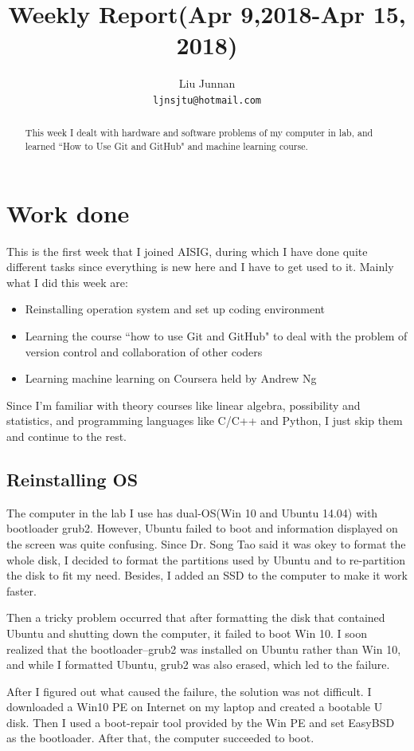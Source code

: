\documentclass{article} %
\title{Weekly Report(Apr 9,2018-Apr 15, 2018)}
\author{
Liu Junnan\\
\texttt{ljnsjtu@hotmail.com}
}
\begin{document}
\maketitle

\begin{abstract}
    This week I dealt with hardware and software problems of my computer in lab, and learned ``How to Use Git and GitHub" and machine learning course.
\end{abstract}

\section{Work done}
This is the first week that I joined AISIG, during which I have done quite different tasks since everything is new here and I have to get used to it. Mainly what I did this week are:
\begin{itemize}
    \item Reinstalling operation system and set up coding environment
    \item Learning the course ``how to use Git and GitHub" to deal with the problem of version control and collaboration of other coders
    \item Learning machine learning on Coursera held by Andrew Ng
\end{itemize}
Since I'm familiar with theory courses like linear algebra, possibility and statistics, and programming languages like C/C++ and Python, I just skip them and continue to the rest.

\subsection{Reinstalling OS}
The computer in the lab I use has dual-OS(Win 10 and Ubuntu 14.04) with bootloader grub2. However, Ubuntu failed to boot and information displayed on the screen was quite confusing. Since Dr. Song Tao said it was okey to format the whole disk, I decided to format the partitions used by Ubuntu and to re-partition the disk to fit my need. Besides, I added an SSD to the computer to make it work faster.

Then a tricky problem occurred that after formatting the disk that contained Ubuntu and shutting down the computer, it failed to boot Win 10. I soon realized that the bootloader--grub2 was installed on Ubuntu rather than Win 10, and while I formatted Ubuntu, grub2 was also erased, which led to the failure.

After I figured out what caused the failure, the solution was not difficult. I downloaded a Win10 PE on Internet on my laptop and created a bootable U disk. Then I used a boot-repair tool provided by the Win PE and set EasyBSD as the bootloader. After that, the computer succeeded to boot.
\end{document}
